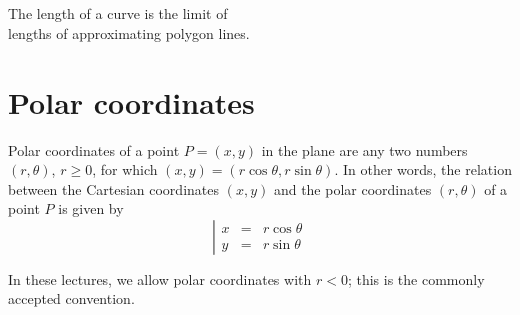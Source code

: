 \documentclass[12pt]{book}
\renewcommand{\optionalDisplay}[1]{}
\newenvironment{figureFixed}{~\\~\medskip\begin{minipage}{\textwidth} \captionsetup{type=figure} }{ \medskip \end{minipage} \medskip }
\begin{document}
\begin{figureFixed}
\begin{center}
\optionalDisplay{
\psset{xunit=1cm,yunit=1cm}
\begin{pspicture}(-1,-1)(4,4.3)
\fcAxesStandard{-0.5}{-0.5}{4}{4}
\rput[b](0,4.1){\tiny$y$}
\rput[b](4.1,0){\tiny$x$}

\psplot[linecolor=blue, plotstyle=curve]{0.2}{4} { x 2 div x 180 mul  sin 1 add  mul 1 add x 3 div  sub   }  %
\psplot[linecolor=black!50, plotpoints=11,plotstyle=line]{0.2}{4}{ x 2 div x 180 mul  sin 1 add  mul 1 add x 3 div  sub   }
\psline[linecolor=red!50](2.1,1.674467844)(2.1,2.650886477)(2.48,2.650886477)
\rput[t](1.9,2.3){\tiny$\diff y$}
\rput[t](2.28,2.85){\tiny$\diff x$}


\rput[t](1,1.8){\tiny$(x(t), y(t))$}
\pscurve[arrows={->}, linestyle=dotted](1,1.8)(1.3, 1.5)(2.1,1.674467844)
\pscurve[arrows={->}, linestyle=dotted](2,4)(2.5, 3.55)(2.48,2.650886477)

\rput[b](2,4){\tiny$(x(t+\Delta), y(t+\Delta))$}

\end{pspicture}
}
\caption{The length of a curve is the limit of \\
lengths of approximating polygon lines.}\label{figCurveLengthDef}
\end{center}
\end{figureFixed}

\section{Polar coordinates}
Polar coordinates of a point $P=(x,y)$ in the plane are any two numbers $(r, \theta)$, $r\geq 0$, for which $(x,y)=(r\cos\theta, r\sin \theta)$. In other words, the relation between the Cartesian coordinates $(x,y)$ and the polar coordinates $(r,\theta)$ of a point $P$ is given by
\[
\left|\begin{array}{rcl}
x&=&r\cos \theta\\
y&=&r\sin\theta
\end{array}\right.
\]

In these lectures, we allow polar coordinates with $ r<0$; this is the commonly accepted convention.
\end{document}
